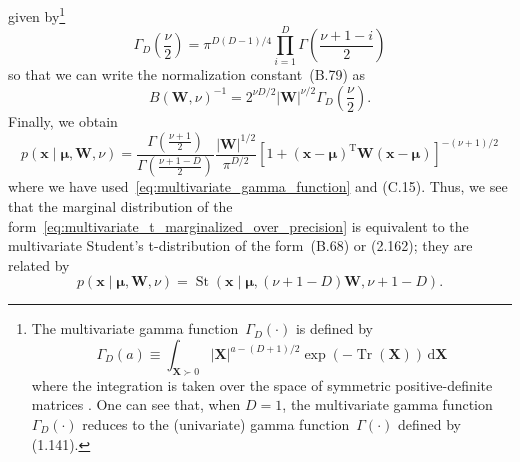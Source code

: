 \documentclass[12pt,a4paper]{article}
\begin{document}
given by\footnote{The multivariate gamma function~$\Gamma_D (\cdot)$ is defined by
\begin{equation}
\Gamma_D (a) \equiv \int_{\mathbf{X} \succ 0}
\left|\mathbf{X}\right|^{a - (D + 1)/2} \exp(-\operatorname{Tr}(\mathbf{X}))
\,\mathrm{d}\mathbf{X}
\label{eq:multivariate_gamma_definition}
\end{equation}
where the integration is taken over the space of symmetric positive-definite matrices
\citep{Anderson:Multivariate,NIST:DLMF}.
One can see that, when $D=1$, the multivariate gamma function~$\Gamma_D (\cdot)$ reduces to
the (univariate) gamma function~$\Gamma(\cdot)$ defined by (1.141).}
\begin{equation}
\Gamma_D \left(\frac{\nu}{2}\right) =
\pi^{D(D - 1)/4} \prod_{i=1}^{D} \Gamma\left(\frac{\nu + 1 - i}{2}\right)
\label{eq:multivariate_gamma_function}
\end{equation}
so that we can write the normalization constant~(B.79) as
\begin{equation}
B(\mathbf{W}, \nu)^{-1} =
2^{\nu D/2}
\left|\mathbf{W}\right|^{\nu/2}
\Gamma_D\left(\frac{\nu}{2}\right) .
\end{equation}
Finally, we obtain
\begin{equation}
p\left(\mathbf{x}\middle|\bm{\mu}, \mathbf{W}, \nu\right)
=
\frac{\Gamma\left(\frac{\nu + 1}{2}\right)}{\Gamma\left(\frac{\nu + 1 - D}{2}\right)}
\frac{\left|\mathbf{W}\right|^{1/2}}{\pi^{D/2}}
\left[
  1 + 
  \left(\mathbf{x} - \bm{\mu}\right)^{\operatorname{T}}
  \mathbf{W}
  \left(\mathbf{x} - \bm{\mu}\right)
\right]^{-(\nu + 1)/2}
\end{equation}
where we have used~\eqref{eq:multivariate_gamma_function} and (C.15).
Thus, we see that the marginal distribution of
the form~\eqref{eq:multivariate_t_marginalized_over_precision}
is equivalent to the multivariate Student's t-distribution of the form~(B.68) or (2.162);
they are related by
\begin{equation}
p\left(\mathbf{x}\middle|\bm{\mu}, \mathbf{W}, \nu\right)
=
\operatorname{St}\left(
  \mathbf{x}\middle|\bm{\mu},
  (\nu + 1 - D) \mathbf{W},
  \nu + 1 - D
\right) .
\label{eq:wishart_marginal_and_multivariate_t}
\end{equation}
\end{document}
